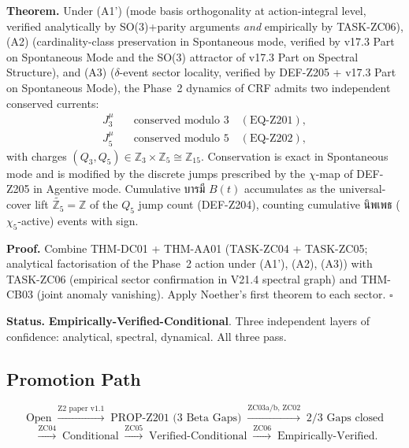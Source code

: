 \documentclass[12pt, a4paper]{article}
\begin{document}
\begin{formalbox}[title={THM-Z201: Phase 2 Conserved $(Q_3, Q_5)$
  --- Empirically-Verified-Conditional}]
\textbf{Theorem.} Under (A1') (mode basis orthogonality at
action-integral level, verified analytically by SO(3)+parity
arguments \emph{and} empirically by TASK-ZC06), (A2)
(cardinality-class preservation in Spontaneous mode, verified by
v17.3 Part on Spontaneous Mode and the SO(3) attractor of v17.3 Part
on Spectral Structure), and (A3) ($\delta$-event sector locality,
verified by DEF-Z205 + v17.3 Part on Spontaneous Mode), the Phase~2
dynamics of CRF admits two independent conserved currents:
\begin{align}
  J^\mu_3 \quad &\text{conserved modulo } 3 \quad (\text{EQ-Z201}), \\
  J^\mu_5 \quad &\text{conserved modulo } 5 \quad (\text{EQ-Z202}),
\end{align}
with charges $(Q_3, Q_5) \in \mathbb{Z}_3 \times \mathbb{Z}_5
\cong \mathbb{Z}_{15}$. Conservation is exact in Spontaneous mode
and is modified by the discrete jumps prescribed by the $\chi$-map
of DEF-Z205 in Agentive mode. Cumulative \textthai{บารมี} $B(t)$
accumulates as the universal-cover lift
$\widetilde{\mathbb{Z}_5} = \mathbb{Z}$ of the $Q_5$ jump count
(DEF-Z204), counting cumulative \textthai{นิพเพธ} ($\chi_5$-active)
events with sign.

\textbf{Proof.} Combine THM-DC01 + THM-AA01 (TASK-ZC04 + TASK-ZC05;
analytical factorisation of the Phase~2 action under (A1'), (A2),
(A3)) with TASK-ZC06 (empirical sector confirmation in V21.4
spectral graph) and THM-CB03 (joint anomaly vanishing). Apply
Noether's first theorem to each sector. \hfill$\square$

\textbf{Status.} \textbf{Empirically-Verified-Conditional}.
Three independent layers of confidence: analytical, spectral,
dynamical. All three pass.
\end{formalbox}

\subsection{Promotion Path}

\[
  \text{Open}
  \;\xrightarrow{\text{Z2 paper v1.1}}\;
  \text{PROP-Z201 (3 Beta Gaps)}
  \;\xrightarrow{\text{ZC03a/b, ZC02}}\;
  \text{2/3 Gaps closed}
\]
\[
  \;\xrightarrow{\text{ZC04}}\;
  \text{Conditional}
  \;\xrightarrow{\text{ZC05}}\;
  \text{Verified-Conditional}
  \;\xrightarrow{\text{ZC06}}\;
  \text{Empirically-Verified.}
\]
\end{document}
